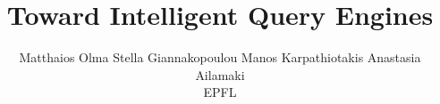 \documentclass[11pt]{article}
\begin{document}
	\title{Toward Intelligent Query Engines}

\author{Matthaios Olma \hspace{1em}  Stella Giannakopoulou 
\hspace{1em} Manos Karpathiotakis \hspace{1em}  Anastasia Ailamaki\\EPFL}



	\maketitle
	
	
	
	
	
	
		
	
		
%
%
	\begin{thebibliography}{10}
	\itemsep=1pt
	\begin{small}
			
	
	\end{small}
	\end{thebibliography} 	
	
\end{document}

